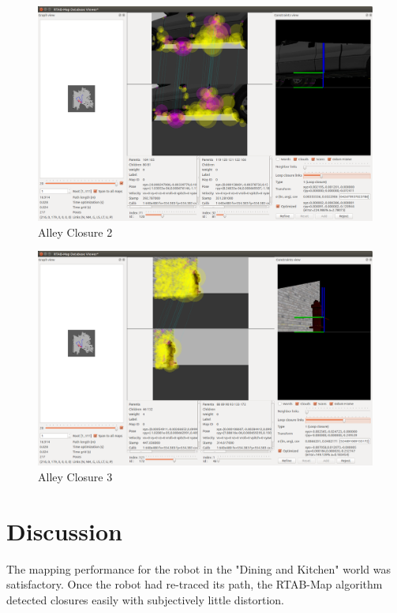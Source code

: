 \documentclass[10pt,journal,compsoc]{IEEEtran}
\begin{document}
\begin{figure}
    \centering
    \includegraphics[width=\linewidth]{alley_closure_2}
    \caption{Alley Closure 2}
    \label{fig:alley_closure_2}
\end{figure}

\begin{figure}
    \centering
    \includegraphics[width=\linewidth]{alley_closure_3}
    \caption{Alley Closure 3}
    \label{fig:alley_closure_3}
\end{figure}

\section{Discussion}
The mapping performance for the robot in the "Dining and Kitchen" world was satisfactory. Once the robot had re-traced its path, the RTAB-Map algorithm detected closures easily with subjectively little distortion.
\end{document}
